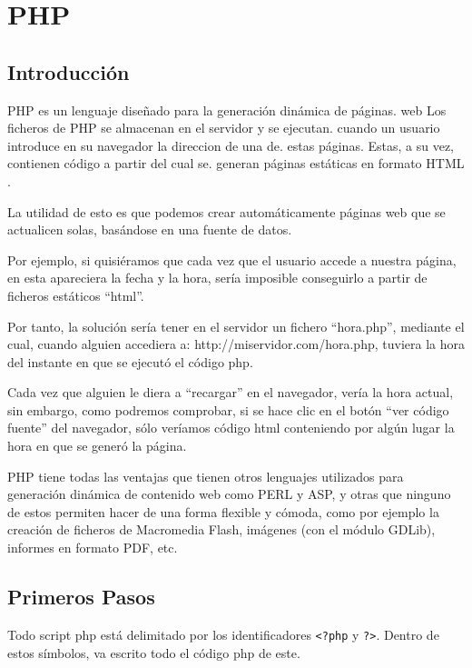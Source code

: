 
\chapter{PHP}

\section{Introducción}

PHP es  un lenguaje diseñado  para la generación dinámica  de páginas.
web Los  ficheros de PHP  se almacenan en  el servidor y  se ejecutan.
cuando un  usuario introduce en su  navegador la direccion de  una de.
estas páginas. Estas, a su vez, contienen código a partir del cual se.
generan páginas estáticas en formato HTML                            .

La utilidad de  esto es que podemos crear  automáticamente páginas web
que se actualicen solas, basándose en una fuente de datos.

Por  ejemplo, si  quisiéramos que  cada vez  que el  usuario accede  a
nuestra página, en esta apareciera la fecha y la hora, sería imposible
conseguirlo a partir de ficheros estáticos ``html''.

Por  tanto,  la  solución  sería  tener  en  el  servidor  un  fichero
``hora.php'',   mediante  el   cual,  cuando   alguien  accediera   a:
http://miservidor.com/hora.php, tuviera la hora del instante en que se
ejecutó el código php.

Cada vez que alguien le diera a ``recargar'' en el navegador, vería la
hora actual, sin embargo, como podremos  comprobar, si se hace clic en
el botón  ``ver código  fuente'' del  navegador, sólo  veríamos código
html conteniendo por algún lugar la hora en que se generó la página.

PHP tiene  todas las  ventajas que  tienen otros  lenguajes utilizados
para generación dinámica de contenido web como PERL y ASP, y otras que
ninguno de estos  permiten hacer de una forma flexible  y cómoda, como
por ejemplo la creación de ficheros de Macromedia Flash, imágenes (con
el módulo GDLib), informes en formato PDF, etc.

\section{Primeros Pasos}

Todo script php está delimitado por los identificadores \verb+<?php+ y
\verb+?>+. Dentro de estos símbolos, va  escrito todo el código php de
este.

